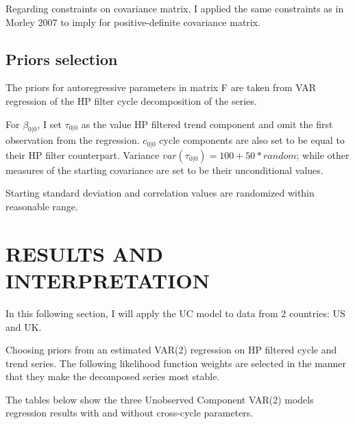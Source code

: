 \documentclass[12pt]{article}
\begin{document}
\begin{outline}[enumerate]

Regarding constraints on covariance matrix, I applied the same constraints as in Morley 2007 to imply for positive-definite covariance matrix.


\subsection{Priors selection}

The priors for autoregressive parameters in matrix F are taken from VAR regression of the HP filter cycle decomposition of the series.

For $\beta_{0|0}$, I set $\tau_{0|0}$ as the value HP filtered trend component and omit the first observation from the regression. $c_{0|0}$ cycle components are also set to be equal to their HP filter counterpart. Variance $var(\tau_{0|0}) =100+50*random$; while other measures of the starting covariance are set to be their unconditional values.

Starting standard deviation and correlation values are randomized within reasonable range.

		
\section{RESULTS AND INTERPRETATION}
		
		In this following section, I will apply the UC model to data from 2 countries: US and UK.
		
Choosing priors from an estimated VAR(2) regression on HP filtered cycle and trend series. The following likelihood function weights are selected in the manner that they make the decomposed series most stable. 
		
		The tables below show the three Unobserved Component VAR(2) models regression results with and without cross-cycle parameters.
		

\end{outline}
\end{document}

